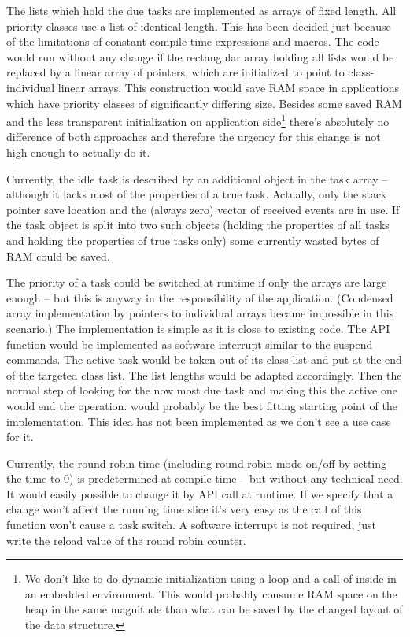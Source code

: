 The lists which hold the due tasks are implemented as arrays of fixed
length. All priority classes use a list of identical length. This has been
decided just because of the limitations of constant compile time
expressions and macros. The code would run without any change if the
rectangular array holding all lists would be replaced by a linear array of
pointers, which are initialized to point to class-individual linear arrays.
This construction would save RAM space in applications which have priority
classes of significantly differing size. Besides some saved RAM and the
less transparent initialization on application side\footnote{We don't like
to do dynamic initialization using a loop and a call of 
inside in an embedded environment. This would probably consume RAM space
on the heap in the same magnitude than what can be saved by the changed
layout of the data structure.} there's absolutely no difference of
both approaches and therefore the urgency for this change is not high
enough to actually do it.

Currently, the idle task is described by an additional object in the task
array -- although it lacks most of the properties of a true task.
Actually, only the stack pointer save location and the (always zero)
vector of received events are in use. If the task object is split into two
such objects (holding the properties of all tasks and holding the
properties of true tasks only) some currently wasted bytes of RAM could be
saved.

The priority of a task could be switched at runtime if only the arrays are
large enough -- but this is anyway in the responsibility of the
application. (Condensed array implementation by pointers to
in\-di\-vi\-dual arrays became impossible in this scenario.) The
implementation is simple as it is close to existing code. The API function
would be implemented as software interrupt similar to the suspend
commands. The active task would be taken out of its class list and put at
the end of the targeted class list. The list lengths would be adapted
accordingly. Then the normal step of looking for the now most due task and
making this the active one would end the operation.  would
probably be the best fitting starting point of the implementation. This
idea has not been implemented as we don't see a use case for it.

Currently, the round robin time (including round robin mode on/off by
setting the time to 0) is predetermined at compile time -- but without any
technical need. It would easily possible to change it by API call at
runtime. If we specify that a change won't affect the running time slice
it's very easy as the call of this function won't cause a task switch. A
software interrupt is not required, just write the reload value of the
round robin counter.

